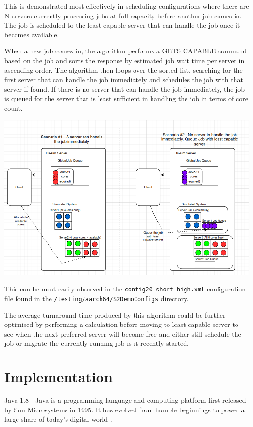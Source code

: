 \documentclass[a4paper]{article}
\begin{document}
This is demonstrated most effectively in scheduling configurations where there are N servers currently processing jobs at full capacity before another job comes in. The job is scheduled to the least capable server that can handle the job once it becomes available.

When a new job comes in, the algorithm performs a GETS CAPABLE command based on the job and sorts the response by estimated job wait time per server in ascending order. The algorithm then loops over the sorted list, searching for the first server that can handle the job immediately and schedules the job with that server if found. If there is no server that can handle the job immediately, the job is queued for the server that is least sufficient in handling the job in terms of core count.

\begin{center}
    \includegraphics[scale=0.3]{images/job-scheduling.png}
\end{center}

This can be most easily observed in the \verb|config20-short-high.xml| configuration file found in the \verb|/testing/aarch64/S2DemoConfigs| directory.

The average turnaround-time produced by this algorithm could be further optimised by performing a calculation before moving to least capable server to see when the next preferred server will become free and either still schedule the job or migrate the currently running job is it recently started.

\section{Implementation}
\label{sec:section4}
Java 1.8 - Java is a programming language and computing platform first released by Sun Microsystems in 1995. It has evolved from humble beginnings to power a large share of today’s digital world \cite{java}.
\end{document}
